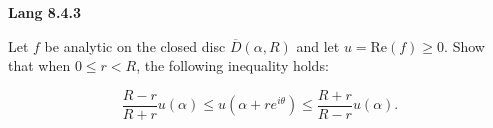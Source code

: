 \textbf{Lang 8.4.3}

Let $f$ be analytic on the closed disc $\overline{D}(\alpha, R)$ and let $u = \text{Re}(f) \ge 0$. Show that when 
$0 \le r < R$, the following inequality holds:

$$
\frac{R - r}{R + r} u(\alpha) \le u(\alpha + r e^{i \theta}) \le \frac{R + r}{R - r} u(\alpha).
$$

\begin{solution}
  \ \\
\end{solution}
